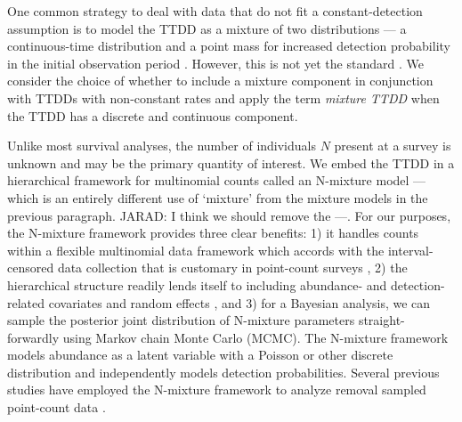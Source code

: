 \documentclass[12pt]{article}
\newcommand{\jarad}[1]{{\color{Orange} JARAD: #1}}
\begin{document}
One common strategy to deal with data that do not fit a constant-detection assumption is to model the TTDD as a mixture of two distributions --- a continuous-time distribution and a point mass for increased detection probability in the initial observation period \citep{Farnsworth2002, Farnsworth2005, EffordDawson2009, Etterson2009, Reidy2011}.
However, this is not yet the standard \citep{Solymos2013, Amundson2014, Reidy2016}. 
We consider the choice of whether to include a mixture component in conjunction with TTDDs with non-constant rates
and apply the term \emph{mixture TTDD} when the TTDD has a discrete and continuous component.

Unlike most survival analyses, the number of individuals $N$ present at a survey is unknown and may be the primary quantity of interest.  
We embed the TTDD in a hierarchical framework for multinomial counts called an N-mixture model \citep{Wyatt2002, Royle2004NMixture} --- which is an entirely different use of `mixture' from the mixture models in the previous paragraph. 
\jarad{I think we should remove the ---.}
For our purposes, the N-mixture framework provides three clear benefits: 1) it handles counts within a flexible multinomial data framework \citep{RoyleDorazio2006} which accords with the interval-censored data collection that is customary in point-count surveys \citep{Ralph1995}, 2) the hierarchical structure readily lends itself to including abundance- and detection-related covariates and random effects \citep{Dorazio2005, Etterson2009, Amundson2014}, and 3) for a Bayesian analysis, we can sample the posterior joint distribution of N-mixture parameters straight-forwardly using Markov chain Monte Carlo (MCMC).  
The N-mixture framework models abundance as a latent variable with a Poisson or other discrete distribution and independently models detection probabilities.  
Several previous studies have employed the N-mixture framework to analyze removal sampled point-count data  \citep{Royle2004Generalized, Dorazio2005, Etterson2009, Solymos2013, Amundson2014, Reidy2016}.  



\end{document}
